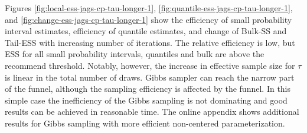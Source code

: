 \documentclass[american,]{article}
\begin{document}
Figures \ref{fig:local-ess-jags-cp-tau-longer-1},
\ref{fig:quantile-ess-jags-cp-tau-longer-1}, and
\ref{fig:change-ess-jags-cp-tau-longer-1} show the efficiency of small
probability interval estimates, efficiency of quantile estimates, and
change of Bulk-SS and Tail-ESS with increasing number of
iterations. The relative efficiency is low, but ESS for all small
probability intervals, quantiles and bulk are above the recommend
threshold. Notably, however, the increase in effective sample size for
$\tau$ is linear in the total number of draws.  Gibbs sampler can
reach the narrow part of the funnel, although the sampling efficiency
is affected by the funnel. In this simple case the inefficiency of the
Gibbs sampling is not dominating and good results can be achieved in
reasonable time. The online appendix shows additional results for Gibbs
sampling with more efficient non-centered parameterization.
\end{document}
